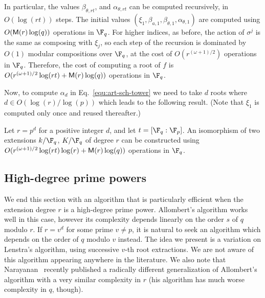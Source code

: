 In particular, the values $\beta_{\theta,rt}$, and
$\alpha_{\theta,rt}$ can be computed recursively, in $O(\log(rt))$
steps. The initial values $(\xi_1,\beta_{a,1}, \beta_{\theta,1},
\alpha_{\theta,1})$ are computed using $O(\mathsf{M}(r)\log(q))$ operations
in $\F_q$. For higher indices, as before, the action of $\sigma^j$ is the same as composing
with $\xi_j$, so each step of the recursion is dominated by $O(1)$
modular compositions over $\F_q$, at the cost of $O(r^{(\omega+1)/2})$
operations in $\F_q$.  Therefore, the cost of
computing a root of $f$ is $O(r^{(\omega+1)/2}\log(rt) +
\mathsf{M}(r)\log(q))$ operations in $\F_q$.

Now, to compute $\alpha_d$ in Eq.~\eqref{equ:art-sch-tower} we 
need to take $d$ roots where $d \in O(\log(r) / \log(p))$ which leads to the following result. (Note that $\xi_1$ is computed only once and reused thereafter.)

\begin{proposition}
	Let $r = p^d$ for a positive integer $d$, and let $t = [\F_q : \F_p]$. An isomorphism of two 
	extensions $k / \F_q$, $K / \F_q$ of degree $r$ can be constructed using 
	$O(r^{(\omega+1)/2}\log(rt)\log(r) + \mathsf{M}(r)\log(q))$ operations in $\F_q$.
\end{proposition}


\subsection{High-degree prime powers}
\label{sec:fast-algor-large}

We end this section with an algorithm that is particularly efficient when the extension 
degree $r$ is a high-degree prime power.
Allombert's algorithm works well in this case, however its
complexity depends linearly on the order $s$ of $q$ modulo $r$. If $r=v^d$ for some prime $v\ne p$,
it is natural to seek an algorithm which depends on the order of $q$ modulo $v$ instead.
The idea we present is a variation on Lenstra's algorithm, using successive $v$-th root
extractions.
We are not aware of this algorithm appearing anywhere in the literature. %
We also note that Narayanan~\cite[Sec.~5]{narayanan2016fast} recently
published a radically different generalization
of Allombert's algorithm with a very similar complexity in $r$ (his
algorithm has much worse complexity in $q$, though).

